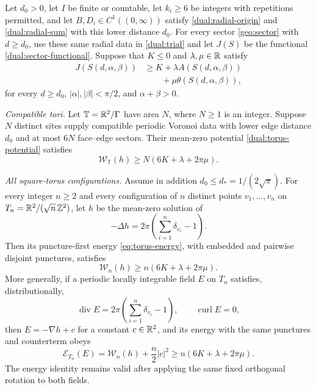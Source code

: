 \begin{proposition}
\label{dual:assembly}
Let \(d_0>0\), let \(I\) be finite or countable, let \(k_i\geq6\)
be integers with repetitions permitted, and let
\(B,D_i\in C^1((0,\infty))\) satisfy
\eqref{dual:radial-origin} and \eqref{dual:radial-sum} with
this lower distance \(d_0\). For every sector \eqref{geo:sector} with
\(d\geq d_0\), use these same radial data in \eqref{dual:trial} and
let \(J(S)\) be the functional \eqref{dual:sector-functional}.
Suppose that \(K\leq0\) and \(\lambda,\mu\in\mathbb R\) satisfy
\begin{equation}
 \begin{aligned}
 J(S(d,\alpha,\beta))
 &\geq K+\lambda A(S(d,\alpha,\beta))\\
 &\qquad+\mu\theta(S(d,\alpha,\beta)),
 \end{aligned}
 \label{dual:sector-input}
\end{equation}
for every \(d\geq d_0\), \(|\alpha|,|\beta|<\pi/2\), and
\(\alpha+\beta>0\).

\emph{Compatible tori.}
Let \(\mathbb T=\mathbb R^2/\Gamma\) have area \(N\), where \(N\geq1\)
is an integer. Suppose \(N\) distinct sites supply compatible periodic
Voronoi data with lower edge distance \(d_0\) and at most \(6N\)
face--edge sectors. Their mean-zero potential
\eqref{dual:torus-potential} satisfies
\begin{equation}\label{dual:compatible-bound}
 \mathcal W_{\mathbb T}(h)\geq N(6K+\lambda+2\pi\mu).
\end{equation}

\emph{All square-torus configurations.}
Assume in addition \(d_0\leq d_*=1/(2\sqrt\pi)\). For every
integer \(n\geq2\) and every configuration of \(n\) distinct
points \(v_1,\ldots,v_n\) on \(T_n=\mathbb R^2/(\sqrt n\,\mathbb Z^2)\), let \(h\)
be the mean-zero solution of
\[
 -\Delta h=2\pi\left(\sum_{i=1}^n\delta_{v_i}-1\right).
\]
Then its puncture-first energy \eqref{eq:torus-energy}, with embedded
and pairwise disjoint punctures, satisfies
\begin{equation}
 \mathcal W_n(h)\geq n(6K+\lambda+2\pi\mu).
 \label{dual:all-configurations}
\end{equation}
More generally, if a periodic locally integrable field \(E\) on \(T_n\)
satisfies, distributionally,
\[
 \operatorname{div}E=2\pi\left(\sum_{i=1}^n\delta_{v_i}-1\right),
 \qquad \operatorname{curl}E=0,
\]
then \(E=-\nabla h+c\) for a constant \(c\in\mathbb R^2\), and its energy
with the same punctures and counterterm obeys
\[
 \mathcal E_{T_n}(E)=\mathcal W_n(h)+\frac n2|c|^2
                    \geq n(6K+\lambda+2\pi\mu).
\]
The energy identity remains valid after applying the same fixed
orthogonal rotation to both fields.
\end{proposition}

